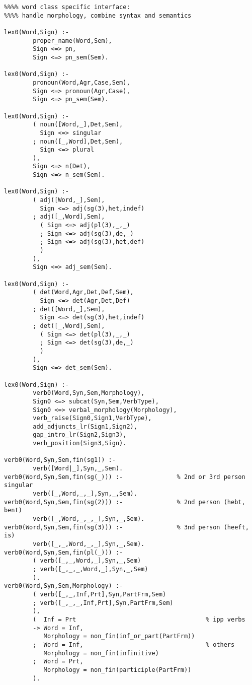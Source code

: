 \begin{verbatim}
%%%% word class specific interface:
%%%% handle morphology, combine syntax and semantics

lex0(Word,Sign) :-
        proper_name(Word,Sem),
        Sign <=> pn,
        Sign <=> pn_sem(Sem).
        
lex0(Word,Sign) :-
        pronoun(Word,Agr,Case,Sem),
        Sign <=> pronoun(Agr,Case),
        Sign <=> pn_sem(Sem).
        
lex0(Word,Sign) :-
        ( noun([Word,_],Det,Sem),
          Sign <=> singular
        ; noun([_,Word],Det,Sem),
          Sign <=> plural
        ),
        Sign <=> n(Det),
        Sign <=> n_sem(Sem).
        
lex0(Word,Sign) :-
        ( adj([Word,_],Sem),
          Sign <=> adj(sg(3),het,indef)
        ; adj([_,Word],Sem),
          ( Sign <=> adj(pl(3),_,_)
          ; Sign <=> adj(sg(3),de,_)
          ; Sign <=> adj(sg(3),het,def)
          )
        ),
        Sign <=> adj_sem(Sem).
        
lex0(Word,Sign) :-
        ( det(Word,Agr,Det,Def,Sem),
          Sign <=> det(Agr,Det,Def)
        ; det([Word,_],Sem),
          Sign <=> det(sg(3),het,indef)
        ; det([_,Word],Sem),
          ( Sign <=> det(pl(3),_,_)
          ; Sign <=> det(sg(3),de,_)
          )
        ),
        Sign <=> det_sem(Sem).
        
lex0(Word,Sign) :-
        verb0(Word,Syn,Sem,Morphology),
        Sign0 <=> subcat(Syn,Sem,VerbType),
        Sign0 <=> verbal_morphology(Morphology),
        verb_raise(Sign0,Sign1,VerbType),       
        add_adjuncts_lr(Sign1,Sign2),
        gap_intro_lr(Sign2,Sign3),
        verb_position(Sign3,Sign).
        
verb0(Word,Syn,Sem,fin(sg1)) :-
        verb([Word|_],Syn,_,Sem).
verb0(Word,Syn,Sem,fin(sg(_))) :-               % 2nd or 3rd person singular
        verb([_,Word,_,_],Syn,_,Sem).
verb0(Word,Syn,Sem,fin(sg(2))) :-               % 2nd person (hebt, bent)
        verb([_,Word,_,_,_],Syn,_,Sem).
verb0(Word,Syn,Sem,fin(sg(3))) :-               % 3nd person (heeft, is)
        verb([_,_,Word,_,_],Syn,_,Sem).
verb0(Word,Syn,Sem,fin(pl(_))) :- 
        ( verb([_,_,Word,_],Syn,_,Sem)
        ; verb([_,_,_,Word,_],Syn,_,Sem)
        ).
verb0(Word,Syn,Sem,Morphology) :-       
        ( verb([_,_,Inf,Prt],Syn,PartFrm,Sem)   
        ; verb([_,_,_,Inf,Prt],Syn,PartFrm,Sem)
        ), 
        (  Inf = Prt                                    % ipp verbs
        -> Word = Inf,
           Morphology = non_fin(inf_or_part(PartFrm))   
        ;  Word = Inf,                                  % others
           Morphology = non_fin(infinitive)
        ;  Word = Prt,
           Morphology = non_fin(participle(PartFrm))
        ).
        

\end{verbatim}
